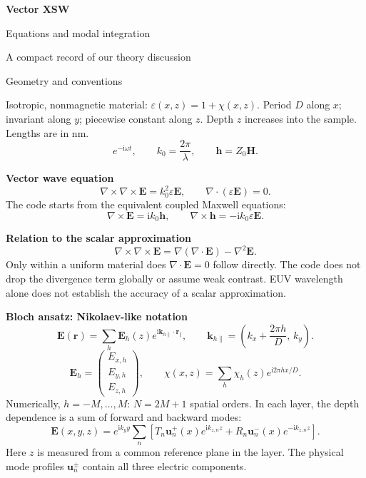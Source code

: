 \documentclass[11pt,a4paper]{article}
\newcommand{\E}{\mathbf E}
\newcommand{\HH}{\mathbf h}
\newcommand{\ii}{\mathrm i}
\newcommand{\topic}[2]{\noindent{\large\bfseries #1}\hfill{\small #2}\par\medskip}
\begin{document}
\begin{center}
{\LARGE\bfseries Vector XSW}\par\vspace{4pt}
{\large Equations and modal integration}\par\vspace{3pt}
{\small A compact record of our theory discussion}
\end{center}
\topic{1. Equation and ansatz}{Geometry and conventions}

Isotropic, nonmagnetic material: $\varepsilon(x,z)=1+\chi(x,z)$.
Period $D$ along $x$; invariant along $y$; piecewise constant along $z$.
Depth $z$ increases into the sample. Lengths are in nm.
\begin{equation}
 e^{-\ii\omega t},\qquad k_0=\frac{2\pi}{\lambda},\qquad \HH=Z_0\mathbf H.
\end{equation}

\textbf{Vector wave equation}
\begin{equation}
 \boxed{\nabla\times\nabla\times\E=k_0^2\varepsilon\E},
 \qquad \nabla\cdot(\varepsilon\E)=0.
\end{equation}
The code starts from the equivalent coupled Maxwell equations:
\begin{equation}
 \nabla\times\E=\ii k_0\HH,\qquad
 \nabla\times\HH=-\ii k_0\varepsilon\E.
\end{equation}

\textbf{Relation to the scalar approximation}
\begin{equation}
 \nabla\times\nabla\times\E=\nabla(\nabla\cdot\E)-\nabla^2\E.
\end{equation}
Only within a uniform material does $\nabla\cdot\E=0$ follow directly.
The code does not drop the divergence term globally or assume weak contrast.
EUV wavelength alone does not establish the accuracy of a scalar approximation.

\textbf{Bloch ansatz: Nikolaev-like notation}
\begin{equation}
 \boxed{\E(\mathbf r)=\sum_h\E_h(z)
 e^{\ii\mathbf k_{h\parallel}\cdot\mathbf r_\parallel}},
 \qquad \mathbf k_{h\parallel}=\left(k_x+\frac{2\pi h}{D},\,k_y\right).
\end{equation}
\begin{equation}
 \E_h=\begin{pmatrix}E_{x,h}\\E_{y,h}\\E_{z,h}\end{pmatrix},
 \qquad \chi(x,z)=\sum_h\chi_h(z)e^{\ii 2\pi hx/D}.
\end{equation}
Numerically, $h=-M,\ldots,M$: $N=2M+1$ spatial orders.
In each layer, the depth dependence is a sum of forward and backward modes:
\begin{equation}
 \E(x,y,z)=e^{\ii k_y y}\sum_n
 \left[T_n\mathbf u_n^+(x)e^{\ii k_{z,n}z}
       +R_n\mathbf u_n^-(x)e^{-\ii k_{z,n}z}\right].
\end{equation}
Here $z$ is measured from a common reference plane in the layer.
The physical mode profiles $\mathbf u_n^\pm$ contain all three electric components.
\end{document}
